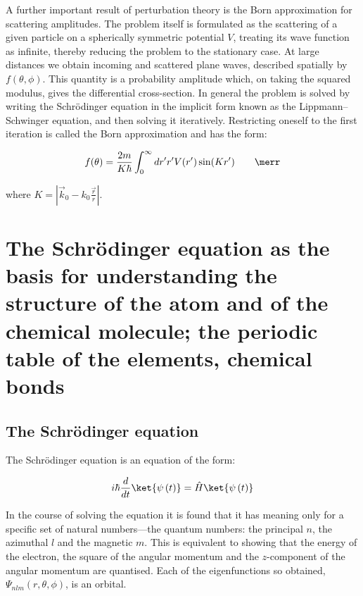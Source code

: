 A further important result of perturbation theory is the Born approximation for scattering amplitudes. The problem itself is formulated as the scattering of a given particle on a spherically symmetric potential $V$, treating its wave function as infinite, thereby reducing the problem to the stationary case. At large distances we obtain incoming and scattered plane waves, described spatially by $f(\theta, \phi)$. This quantity is a probability amplitude which, on taking the squared modulus, gives the differential cross-section. In general the problem is solved by writing the Schrödinger equation in the implicit form known as the Lippmann--Schwinger equation, and then solving it iteratively. Restricting oneself to the first iteration is called the Born approximation and has the form:

\[f(\theta) = \frac{2m}{K\hbar}\int_0^\infty dr' r'V(r')\sin(Kr') \qquad \merr\]

where $K=\left|\vec k_0 - k_0\frac{\vec r}{r}\right|$.

\section{The Schrödinger equation as the basis for understanding the structure of the atom and of the chemical molecule; the periodic table of the elements, chemical bonds}

\subsection{The Schrödinger equation}

The Schrödinger equation is an equation of the form:

\begin{equation}
    i\hbar\frac{d}{dt}\ket{\psi\left(t\right)} = \hat{H}\ket{\psi\left(t\right)}
\end{equation}

In the course of solving the equation it is found that it has meaning only for a specific set of natural numbers---the quantum numbers: the principal $n$, the azimuthal $l$ and the magnetic $m$. This is equivalent to showing that the energy of the electron, the square of the angular momentum and the $z$-component of the angular momentum are quantised. Each of the eigenfunctions so obtained, $\Psi_{nlm}\left(r,\theta,\phi\right)$, is an orbital.

